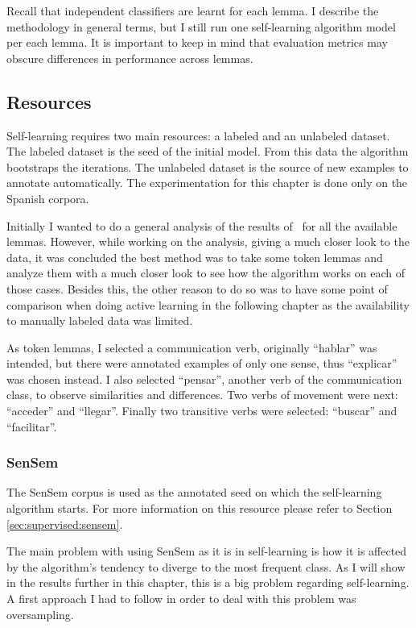 Recall that independent classifiers are learnt for each lemma. I describe the
methodology in general terms, but I still run one self-learning algorithm model
per each lemma. It is important to keep in mind that evaluation metrics may
obscure differences in performance across lemmas.

\subsection{Resources}\label{sec:self-learning:resources}

Self-learning requires two main resources: a labeled and an unlabeled dataset.
The labeled dataset is the seed of the initial model. From this data the
algorithm bootstraps the iterations. The unlabeled dataset is the source of new
examples to annotate automatically. The experimentation for this chapter is
done only on the Spanish corpora.

Initially I wanted to do a general analysis of the results of \vsd~for all the
available lemmas. However, while working on the analysis, giving a much closer
look to the data, it was concluded the best method was to take some token
lemmas and analyze them with a much closer look to see how the algorithm works
on each of those cases. Besides this, the other reason to do so was to have
some point of comparison when doing active learning in the following chapter as
the availability to manually labeled data was limited.

As token lemmas, I selected a communication verb, originally ``hablar'' was
intended, but there were annotated examples of only one sense, thus
``explicar'' was chosen instead. I also selected ``pensar'', another verb of
the communication class, to observe similarities and differences. Two verbs of
movement were next: ``acceder'' and ``llegar''. Finally two transitive verbs
were selected: ``buscar'' and ``facilitar''.

\subsubsection{SenSem}

The SenSem corpus is used as the annotated seed on which the self-learning
algorithm starts. For more information on this resource please refer to Section
\ref{sec:supervised:sensem}.

The main problem with using SenSem as it is in self-learning is how it is
affected by the algorithm's tendency to diverge to the most frequent class. As
I will show in the results further in this chapter, this is a big problem
regarding self-learning. A first approach I had to follow in order to deal with
this problem was oversampling.

